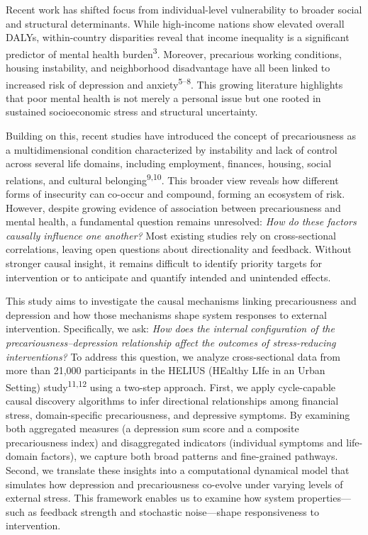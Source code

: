 \documentclass[
]{article}
\begin{document}
Recent work has shifted focus from individual-level vulnerability to
broader social and structural determinants. While high-income nations
show elevated overall DALYs, within-country disparities reveal that
income inequality is a significant predictor of mental health
burden\textsuperscript{3}. Moreover, precarious working conditions,
housing instability, and neighborhood disadvantage have all been linked
to increased risk of depression and anxiety\textsuperscript{5--8}. This
growing literature highlights that poor mental health is not merely a
personal issue but one rooted in sustained socioeconomic stress and
structural uncertainty.

Building on this, recent studies have introduced the concept of
precariousness as a multidimensional condition characterized by
instability and lack of control across several life domains, including
employment, finances, housing, social relations, and cultural
belonging\textsuperscript{9,10}. This broader view reveals how different
forms of insecurity can co-occur and compound, forming an ecosystem of
risk. However, despite growing evidence of association between
precariousness and mental health, a fundamental question remains
unresolved: \emph{How do these factors causally influence one another?}
Most existing studies rely on cross-sectional correlations, leaving open
questions about directionality and feedback. Without stronger causal
insight, it remains difficult to identify priority targets for
intervention or to anticipate and quantify intended and unintended
effects.

This study aims to investigate the causal mechanisms linking
precariousness and depression and how those mechanisms shape system
responses to external intervention. Specifically, we ask: \emph{How does
the internal configuration of the precariousness--depression
relationship affect the outcomes of stress-reducing interventions?} To
address this question, we analyze cross-sectional data from more than
21,000 participants in the HELIUS (HEalthy LIfe in an Urban Setting)
study\textsuperscript{11,12} using a two-step approach. First, we apply
cycle-capable causal discovery algorithms to infer directional
relationships among financial stress, domain-specific precariousness,
and depressive symptoms. By examining both aggregated measures (a
depression sum score and a composite precariousness index) and
disaggregated indicators (individual symptoms and life-domain factors),
we capture both broad patterns and fine-grained pathways. Second, we
translate these insights into a computational dynamical model that
simulates how depression and precariousness co-evolve under varying
levels of external stress. This framework enables us to examine how
system properties---such as feedback strength and stochastic
noise---shape responsiveness to intervention.
\end{document}
